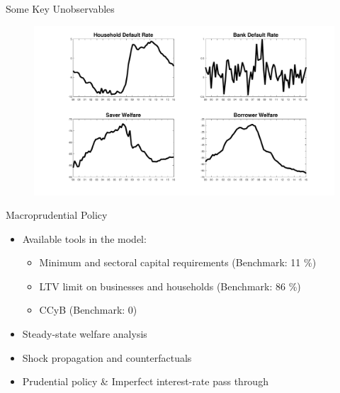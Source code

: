 \documentclass[8pt,aspectratio=169]{beamer}
\numberwithin{equation}{section}
\begin{document}
\begin{frame}{Some Key Unobservables}



\begin{figure}
\includegraphics[scale=0.25]{smoothed_variables.pdf}
\end{figure}


\end{frame}



\begin{frame}{Macroprudential Policy}

\begin{itemize}

\item Available tools in the model: 
\vspace{3 mm}
\begin{itemize}
\item Minimum and sectoral capital requirements (Benchmark: 11 \%)
\vspace{3 mm}
\item LTV limit on businesses and households (Benchmark: 86 \%)
\vspace{3 mm}
\item CCyB (Benchmark: 0)
\end{itemize}
\vspace{5 mm}
\item Steady-state welfare analysis
\vspace{5 mm}
\item Shock propagation and counterfactuals
\vspace{5 mm}
\item Prudential policy \& Imperfect interest-rate pass through

\end{itemize}
\end{frame}
\end{document}
